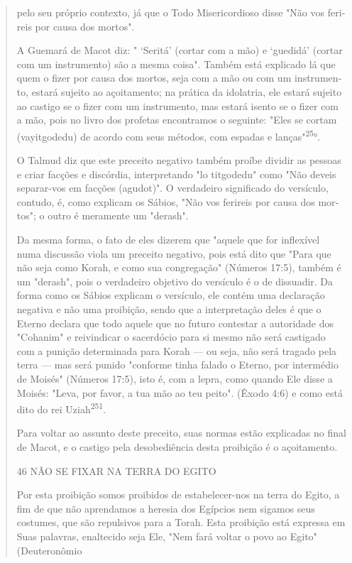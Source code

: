 \begin{quote}
pelo seu próprio contexto, já que o Todo Misericordioso disse "Não vos
feri­reis por causa dos mortos".

A Guemará de Macot diz: " `Seritá' (cortar com a mão) e `guedidá'
(cortar com um instrumento) são a mesma coisa". Também está explicado lá
que quem o fizer por causa dos mortos, seja com a mão ou com um
instrumen­to, estará sujeito ao açoitamento; na prática da idolatria,
ele estará sujeito ao castigo se o fizer com um instrumento, mas estará
isento se o fizer com a mão, pois no livro dos profetas encontramos o
seguinte: "Eles se cortam (vayitgode­du) de acordo com seus métodos, com
espadas e lanças"\textsuperscript{25}°.

O Talmud diz que este preceito negativo também proíbe dividir as pessoas
e criar facções e discórdia, interpretando "lo titgodedu" como "Não
deveis separar-vos em facções (agudot)". O verdadeiro significado do
versícu­lo, contudo, é, como explicam os Sábios, "Não vos ferireis por
causa dos mor­tos"; o outro é meramente um "derash".

Da mesma forma, o fato de eles dizerem que "aquele que for inflexí­vel
numa discussão viola um preceito negativo, pois está dito que "Para que
não seja como Korah, e como sua congregação" (Números 17:5), também é um
"derash", pois o verdadeiro objetivo do versículo é o de dissuadir. Da
forma como os Sábios explicam o versículo, ele contém uma declaração
negativa e não uma proibição, sendo que a interpretação deles é que o
Eterno declara que todo aquele que no futuro contestar a autoridade dos
"Cohanim" e reivindicar o sacerdócio para si mesmo não será castigado
com a punição determinada pa­ra Korah --- ou seja, não será tragado pela
terra --- mas será punido "conforme tinha falado o Eterno, por
intermédio de Moisés" (Números 17:5), isto é, com a lepra, como quando
Ele disse a Moisés: "Leva, por favor, a tua mão ao teu peito". (Êxodo
4:6) e como está dito do rei Uziah\textsuperscript{251}.

Para voltar ao assunto deste preceito, suas normas estão explicadas no
final de Macot, e o castigo pela desobediência desta proibição é o
açoitamento.

46 NÃO SE FIXAR NA TERRA DO EGITO

Por esta proibição somos proibidos de estabelecer-nos na terra do Egito,
a fim de que não aprendamos a heresia dos Egípcios nem sigamos seus
costumes, que são repulsivos para a Torah. Esta proibição está expressa
em Suas palavras, enaltecido seja Ele, "Nem fará voltar o povo ao Egito"
(Deuteronômio
\end{quote}

